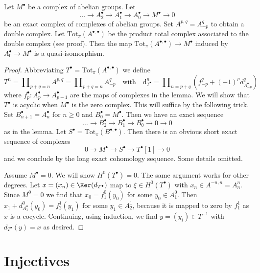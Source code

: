 \begin{lemma}
\label{lemma-resolution-gives-qis}
Let $M^\bullet$ be a complex of abelian groups. Let
$$
\ldots \to A_2^\bullet \to A_1^\bullet \to A_0^\bullet \to M^\bullet \to 0
$$
be an exact complex of complexes of abelian groups. Set $A^{p, q} = A_{-p}^q$
to obtain a double complex. Let $\text{Tot}_\pi(A^{\bullet, \bullet})$
be the product total complex associated to the double complex (see proof).
Then the map $\text{Tot}_\pi(A^{\bullet, \bullet}) \to M^\bullet$
induced by $A_0^\bullet \to M^\bullet$ is a quasi-isomorphism.
\end{lemma}

\begin{proof}
Abbreviating $T^\bullet = \text{Tot}_\pi(A^{\bullet, \bullet})$
we define
$$
T^n = \prod\nolimits_{p + q = n} A^{p, q} =
\prod\nolimits_{p + q = n} A_{-p}^q
\quad\text{with}\quad
\text{d}_{T^\bullet}^n =
\prod\nolimits_{n = p + q} (f_{-p}^q + (-1)^pd_{A_{-p}^\bullet}^q)
$$
where $f_p^\bullet : A_p^\bullet \to A_{p - 1}^\bullet$
are the maps of complexes in the lemma.
We will show that $T^\bullet$ is acyclic when
$M^\bullet$ is the zero complex. This will suffice by
the following trick. Set $B_{n + 1}^\bullet = A_n^\bullet$ for $n \geq 0$
and $B_0^\bullet = M^\bullet$. Then we have an exact sequence
$$
\ldots \to B_2^\bullet \to B_1^\bullet \to B_0^\bullet \to 0 \to 0
$$
as in the lemma. Let $S^\bullet = \text{Tot}_\pi(B^{\bullet, \bullet})$.
Then there is an obvious short exact sequence of complexes
$$
0 \to M^\bullet \to S^\bullet \to T^\bullet[1] \to 0
$$
and we conclude by the long exact cohomology sequence. Some details omitted.

\medskip\noindent
Assume $M^\bullet = 0$. We will show $H^0(T^\bullet) = 0$. The same argument
works for other degrees. Let $x =(x_n) \in \Ker(d_{T^\bullet})$
map to $\xi \in H^0(T^\bullet)$ with $x_n \in A^{-n, n} = A_n^n$.
Since $M^0 = 0$ we find that $x_0 = f_1^0(y_0)$ for some $y_0 \in A_1^0$.
Then $x_1 + d^0_{A_1^\bullet}(y_0) = f_2^1(y_1)$ for some
$y_1 \in A_2^1$, because it is mapped to zero by $f_1^1$
as $x$ is a cocycle. Continuing, using induction, we find
$y = (y_i) \in T^{-1}$ with $d_{T^\bullet}(y) = x$ as desired.
\end{proof}







\section{Injectives}
\label{section-injectives}

